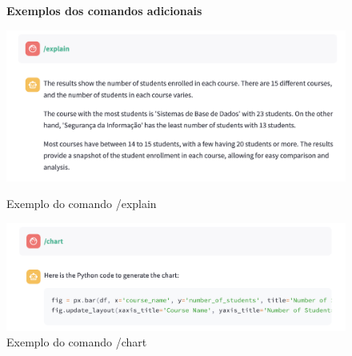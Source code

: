 \documentclass{article}
\begin{document}
\begin{figure}[!h]
    \centering
        \textbf{Exemplos dos comandos adicionais} \\[0.3cm] %
    \begin{minipage}{0.46\linewidth}
        \centering
        \includegraphics[width=\linewidth]{images/explain.png}
        \caption{Exemplo do comando /explain}
        \label{fig:explain}
    \end{minipage}
    \hspace{0.01\linewidth} %
    \begin{minipage}{0.46\linewidth}
        \centering
        \includegraphics[width=\linewidth]{images/chart.png}
        \caption{Exemplo do comando /chart}
        \label{fig:chart}
    \end{minipage}

    \vspace{0.5cm} %


\end{figure}
\end{document}
